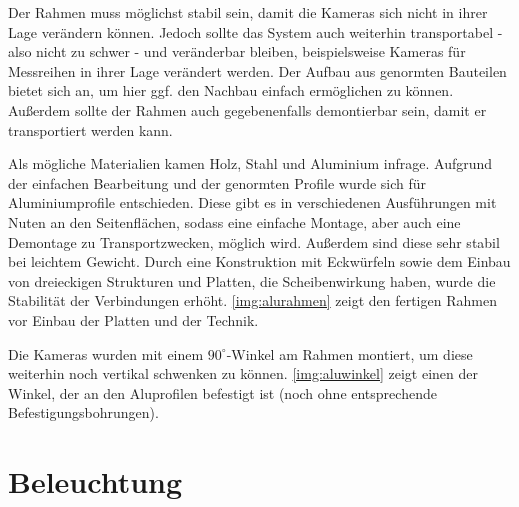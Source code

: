 \documentclass[./00PhotoBox.tex]{subfiles}
\begin{document}
Der Rahmen muss möglichst stabil sein, damit die Kameras sich nicht in ihrer Lage verändern können. Jedoch sollte das System auch weiterhin transportabel - also nicht zu schwer - und veränderbar bleiben, beispielsweise Kameras für Messreihen in ihrer Lage verändert werden. Der Aufbau aus genormten Bauteilen bietet sich an, um hier ggf. den Nachbau einfach ermöglichen zu können. Außerdem sollte der Rahmen auch gegebenenfalls demontierbar sein, damit er transportiert werden kann.

Als mögliche Materialien kamen Holz, Stahl und Aluminium infrage. Aufgrund der einfachen Bearbeitung und der genormten Profile wurde sich für Aluminiumprofile entschieden. Diese gibt es in verschiedenen Ausführungen mit Nuten an den Seitenflächen, sodass eine einfache Montage, aber auch eine Demontage zu Transportzwecken, möglich wird. Außerdem sind diese sehr stabil bei leichtem Gewicht. Durch eine Konstruktion mit Eckwürfeln sowie dem Einbau von dreieckigen Strukturen und Platten, die Scheibenwirkung haben, wurde die Stabilität der Verbindungen erhöht. \autoref{img:alurahmen} zeigt den fertigen Rahmen vor Einbau der Platten und der Technik.

Die Kameras wurden mit einem $90^\circ$-Winkel am Rahmen montiert, um diese weiterhin noch vertikal schwenken zu können. \autoref{img:aluwinkel} zeigt einen der Winkel, der an den Aluprofilen befestigt ist (noch ohne entsprechende Befestigungsbohrungen).


\section{Beleuchtung}
\end{document}
